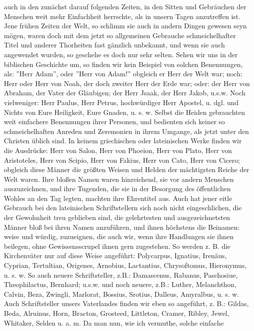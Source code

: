 auch in den zunächst darauf folgenden Zeiten, in den Sitten und Gebräuchen der
Menschen weit mehr Einfachheit herrschte, als in unsern Tagen anzutreffen ist.
Jene frühen Zeiten der Welt, so schlimm sie auch in andern Dingen gewesen seyn
mögen, waren doch mit dem jetzt so allgemeinen Gebrauche schmeichelhafter Titel
und anderer Thorheiten fast gänzlich unbekannt, und wenn sie auch angewendet
wurden, so geschehe es doch nur sehr selten. Sehen wir uns in der biblischen
Geschichte um, so finden wir kein Beispiel von solchen Benennungen, als: ''Herr
Adam'', oder ''Herr von Adam!'' obgleich er Herr der Welt war; noch: Herr oder
Herr von Noah, der doch zweiter Herr der Erde war; oder: der Herr von Abraham,
der Vater der Gläubigen; der Herr Jsaak, der Herr Jakob, u.s.w. Noch
vielweniger: Herr Paulus, Herr Petrus, hochwürdiger Herr Apostel, u. dgl. und
Nichts von Eure Heiligkeit, Eure Gnaden, u. s. w. Selbst die Heiden gebrauchten
weit einfachere Benennungen ihrer Personen, und bedienten sich keiner so
schmeichelhaften Anreden und Zeremonien in ihrem Umgange, als jetzt unter den
Christen üblich sind. In keinem griechischen oder lateinischen Werke finden wir
die Ausdrücke: Herr von Salon, Herr von Phoeion, Herr von Plato, Herr von
Aristoteles, Herr von Scipio, Herr von Fakius, Herr von Cato, Herr von Cicero;
obgleich diese Männer die größten Weisen und Helden der mächtigsten Reiche der
Welt waren. Ihre bloßen Namen waren hinreichend, sie vor andern Menschen
auszuzeichnen, und ihre Tugenden, die sie in der Besorgung des öffentlichen
Wohles an den Tag legten, machten ihre Ehrentitel aus. Auch hat jener eitle
Gebrauch bei den lateinischen Schriftstellern sich noch nicht eingeschlichen,
die der Gewohnheit treu geblieben sind, die gelehrtesten und ausgezeichnetsten
Männer bloß bei ihren Namen anzuführen, und ihnen höchstens die Beinamen: weise
und würdig, zuzueignen, die auch wir, wenn ihre Handlungen sie ihnen beilegen,
ohne Gewissensscrupel ihnen gern zugestehen. So werden z. B. die Kirchenväter
nur auf diese Weise angeführt: Polycarpus, Ignatius, Irenäus, Cyprian,
Tertultian, Origenes, Arnobius, Lactantius, Chrysoftomus, Hieronymus, u. s. w.
So auch neuere Schriftsteller, z.B.: Damascenus, Rabanus, Paschosiue,
Theophilactus, Bernhard; u.s.w. und noch neuere, z.B.: Luther, Melanchthon,
Calvin, Beza, Zwingli, Marlorat, Bossius, Srotius, Dalleus, Amyralbus, u. s. w.
Auch Schriftsteller unsers Vaterlandes finden wir eben so angeführt, z. B.:
Gildas, Beda, Alruinus, Horn, Bracton, Grosteed, Littleton, Cramer, Ribley,
Jewel, Whitaker, Selden u. a. m. Da man nun, wie ich vermuthe, solche einfache
